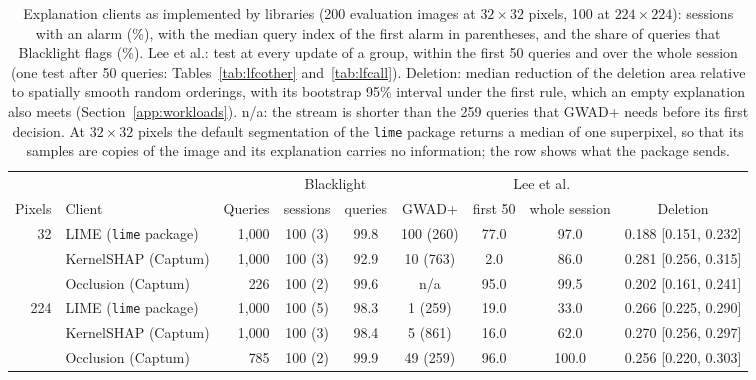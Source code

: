 \begin{table}[!tbp]
\centering\footnotesize\setlength{\tabcolsep}{4pt}
\caption{Explanation clients as implemented by libraries (200 evaluation images at $32\times32$ pixels, 100 at $224\times224$): sessions with an alarm (\%), with the median query index of the first alarm in parentheses, and the share of queries that Blacklight flags (\%). Lee et al.: test at every update of a group, within the first 50 queries and over the whole session (one test after 50 queries: Tables~\ref{tab:lfcother} and~\ref{tab:lfcall}). Deletion: median reduction of the deletion area relative to spatially smooth random orderings, with its bootstrap 95\% interval under the first rule, which an empty explanation also meets (Section~\ref{app:workloads}). n/a: the stream is shorter than the 259 queries that GWAD+ needs before its first decision. At $32\times32$ pixels the default segmentation of the \texttt{lime} package returns a median of one superpixel, so that its samples are copies of the image and its explanation carries no information; the row shows what the package sends.}
\label{tab:libraries}
\vspace{3pt}
\begin{adjustbox}{max width=\textwidth}
\begin{tabular}{rlrcccccc}
\toprule
& & & \multicolumn{2}{c}{Blacklight} & & \multicolumn{2}{c}{Lee et al.} & \\
\cmidrule(lr){4-5}\cmidrule(lr){7-8}
Pixels & Client & Queries & sessions & queries & GWAD+ & first 50 & whole session & Deletion \\
\midrule
32 & LIME (\texttt{lime} package) & 1{,}000 & 100 (3) & 99.8 & 100 (260) & 77.0 & 97.0 & 0.188 {[}0.151, 0.232{]} \\
 & KernelSHAP (Captum) & 1{,}000 & 100 (3) & 92.9 & 10 (763) & 2.0 & 86.0 & 0.281 {[}0.256, 0.315{]} \\
 & Occlusion (Captum) & 226 & 100 (2) & 99.6 & n/a & 95.0 & 99.5 & 0.202 {[}0.161, 0.241{]} \\[2pt]
224 & LIME (\texttt{lime} package) & 1{,}000 & 100 (5) & 98.3 & 1 (259) & 19.0 & 33.0 & 0.266 {[}0.225, 0.290{]} \\
 & KernelSHAP (Captum) & 1{,}000 & 100 (3) & 98.4 & 5 (861) & 16.0 & 62.0 & 0.270 {[}0.256, 0.297{]} \\
 & Occlusion (Captum) & 785 & 100 (2) & 99.9 & 49 (259) & 96.0 & 100.0 & 0.256 {[}0.220, 0.303{]} \\
\bottomrule
\end{tabular}
\end{adjustbox}
\end{table}
